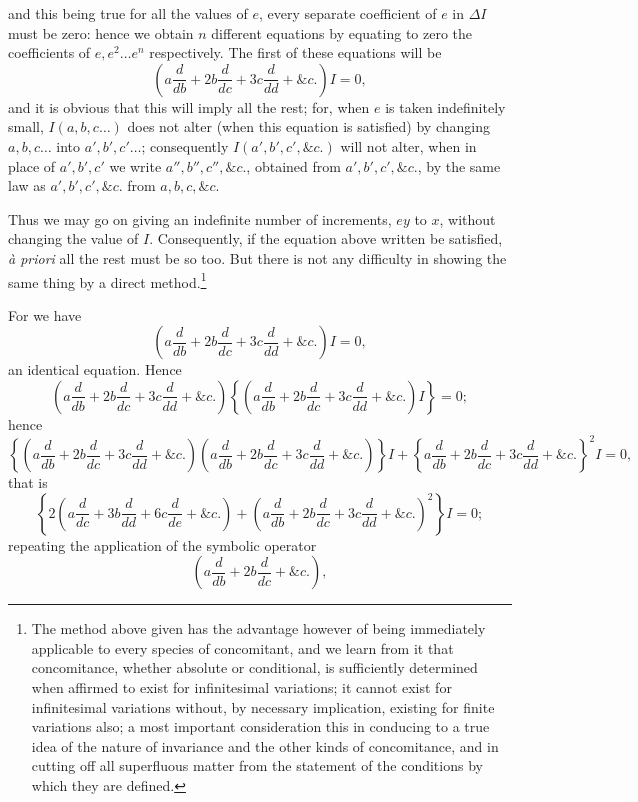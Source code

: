 \documentclass[11pt]{article}
\newcommand{\sourcepage}[1]{\marginpar{\scriptsize p.~#1}}
\begin{document}
{{\sourcepage{353}
and this being true for all the values of $e$, every separate coefficient of $e$ in $\Delta I$ must be zero: hence we obtain $n$ different equations by equating to zero the coefficients of $e,e^2\ldots e^n$ respectively. The first of these equations will be
\[
\left(a\frac{d}{db}+2b\frac{d}{dc}+3c\frac{d}{dd}+\&c.\right)I=0,
\]
and it is obvious that this will imply all the rest; for, when $e$ is taken indefinitely small, $I(a,b,c\ldots)$ does not alter (when this equation is satisfied) by changing $a,b,c\ldots$ into $a',b',c'\ldots$; consequently $I(a',b',c',\&c.)$ will not alter, when in place of $a',b',c'$ we write $a'',b'',c'',\&c.$, obtained from $a',b',c',\&c.$, by the same law as $a',b',c',\&c.$ from $a,b,c,\&c.$

Thus we may go on giving an indefinite number of increments, $ey$ to $x$, without changing the value of $I$. Consequently, if the equation above written be satisfied, \emph{à priori} all the rest must be so too. But there is not any difficulty in showing the same thing by a direct method.\footnote{The method above given has the advantage however of being immediately applicable to every species of concomitant, and we learn from it that concomitance, whether absolute or conditional, is sufficiently determined when affirmed to exist for infinitesimal variations; it cannot exist for infinitesimal variations without, by necessary implication, existing for finite variations also; a most important consideration this in conducing to a true idea of the nature of invariance and the other kinds of concomitance, and in cutting off all superfluous matter from the statement of the conditions by which they are defined.}

For we have
\[
\left(a\frac{d}{db}+2b\frac{d}{dc}+3c\frac{d}{dd}+\&c.\right)I=0,
\]
an identical equation. Hence
\[
\left(a\frac{d}{db}+2b\frac{d}{dc}+3c\frac{d}{dd}+\&c.\right)
\left\{\left(a\frac{d}{db}+2b\frac{d}{dc}+3c\frac{d}{dd}+\&c.\right)I\right\}=0;
\]
hence
\[
\left\{\left(a\frac{d}{db}+2b\frac{d}{dc}+3c\frac{d}{dd}+\&c.\right)
\left(a\frac{d}{db}+2b\frac{d}{dc}+3c\frac{d}{dd}+\&c.\right)\right\}I
+\left\{a\frac{d}{db}+2b\frac{d}{dc}+3c\frac{d}{dd}+\&c.\right\}^2I=0,
\]
that is
\[
\left\{2\left(a\frac{d}{dc}+3b\frac{d}{dd}+6c\frac{d}{de}+\&c.\right)
+\left(a\frac{d}{db}+2b\frac{d}{dc}+3c\frac{d}{dd}+\&c.\right)^2\right\}I=0;
\]
repeating the application of the symbolic operator
\[
\left(a\frac{d}{db}+2b\frac{d}{dc}+\&c.\right),
\]

}}
\end{document}
